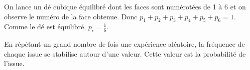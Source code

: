 \begin{Ex}
On lance un dé cubique équilibré dont les faces sont numérotées de 1 à 6 et on observe le numéro de la face obtenue.   Donc $p_1+p_2+p_3+p_4+p_5+p_6=1$. Comme le dé est équilibré, $p_i=\frac{1}{6}$.
\end{Ex}


\begin{Pp}
En répétant un grand nombre de fois une expérience aléatoire, la fréquence de chaque issue se stabilise autour d'une valeur. Cette valeur est la probabilité de l'issue.
\end{Pp}










 